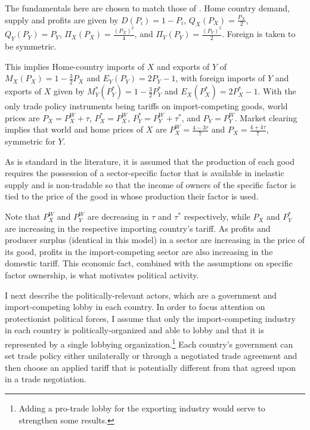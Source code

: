\documentclass[12pt]{article}
\begin{document}
The fundamentals here are chosen to match those of \Textcite{bs2001,bs2005}. Home country demand, supply and profits are given by $D(P_i) = 1 - P_i$, $Q_X(P_X) = \frac{P_X}{2}$, $Q_Y(P_Y) = P_Y$, $\Pi_X(P_X) = \frac{(P_X)^2}{4}$, and $\Pi_Y(P_Y) = \frac{(P_Y)^2}{2}$. %
Foreign is taken to be symmetric.

This implies Home-country imports of $X$ and exports of $Y$ of $M_X(P_X)= 1 - \frac{3}{2}P_X$ and $E_Y(P_Y)= 2P_Y -1$, with foreign imports of $Y$ and exports of $X$ given by $M_Y^*(P_Y^*)= 1 - \frac{3}{2}P_Y^*$ and $E_X(P_X^*)= 2P_X^* -1$. With the only trade policy instruments being tariffs on import-competing goods, world prices are $P_X = P_X^W + \tau$, $P_X^* = P_X^W$, $P_Y^* = P_Y^W + \tau^*$, and $P_Y = P_Y^W$. Market clearing implies that world and home prices of $X$ are $P_X^W = \frac{4-3\tau}{7}$ and $P_X = \frac{4+4\tau}{7}$, symmetric for $Y$.

As is standard in the literature, it is assumed that the production of each good requires the possession of a sector-specific factor that is available in inelastic supply and is non-tradable so that the income of owners of the specific factor is tied to the price of the good in whose production their factor is used. 

Note that $P_X^W$ and $P_Y^W$ are decreasing in $\tau$ and $\tau^*$ respectively, while $P_X$ and $P_Y^*$ are increasing in the respective importing country's tariff. As profits and producer surplus (identical in this model) in a sector are increasing in the price of its good, profits in the import-competing sector are also increasing in the domestic tariff. This economic fact, combined with the assumptions on specific factor ownership, is what motivates political activity.

I next describe the politically-relevant actors, which are a government and import-competing lobby in each country. In order to focus attention on protectionist political forces, I assume that only the import-competing industry in each country is politically-organized and able to lobby and that it is represented by a single lobbying organization.\footnote{Adding a pro-trade lobby for the exporting industry would serve to strengthen some results.} Each country's government can set trade policy either unilaterally or through a negotiated trade agreement and then choose an applied tariff that is potentially different from that agreed upon in a trade negotiation.
\end{document}
